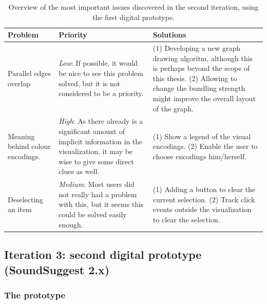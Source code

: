\begin{table}
	\caption{Overview of the most important issues discovered in the second iteration, using the first digital prototype.}
	\begin{center}
		\begin{tabular}{p{70px} | p{180px} | p{180px} }
			\hline
			\textbf{Problem} & \textbf{Priority} & \textbf{Solutions} \\
			\hline
			
			Parallel edges overlap
			&
			\emph{Low}: If possible, it would be nice to see this problem solved, but it is not considered to be a priority.
			&
			(1) Developing a new graph drawing algoritm, although this is perhaps beyond the scope of this thesis. (2) Allowing to change the bundling strength might improve the overall layout of the graph.
			\\
			
			Meaning behind colour encodings.
			&
			\emph{High}: As there already is a significant amount of implicit information in the visualization, it may be wise to give some direct clues as well.
			&
			(1) Show a legend of the visual encodings. (2) Enable the user to choose encodings him/herself. %
			\\
			
			Deselecting an item
			&
			\emph{Medium}: Most users did not really had a problem with this, but it seems this could be solved easily enough.
			&
			(1) Adding a button to clear the current selection. (2) Track click events outside the visualization to clear the selection.
			\\
			
			\hline
		\end{tabular}
	\end{center}
\label{table:iteration2:issues}
\end{table}



\subsection{Iteration 3: second digital prototype (SoundSuggest 2.x)}\label{chapter:prototype:section:soundsuggest2}

\subsubsection{The prototype}\label{chapter:prototype:section:soundsuggest2:prototype}

